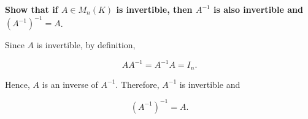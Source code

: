 \item \textbf{Show that if $A\in M_n(K)$ is invertible,
    then $A^{-1}$ is also invertible and} $ (A^{-1})^{-1}=A$.
        
    \begin{answer}
        Since $A$ is invertible, by definition,

        $$
        AA^{-1}=A^{-1}A=I_n.
        $$

        Hence, $A$ is an inverse of $A^{-1}$.
        Therefore, $A^{-1}$ is invertible and

        $$
        \boxed{(A^{-1})^{-1}=A}.
        $$
    \end{answer}

